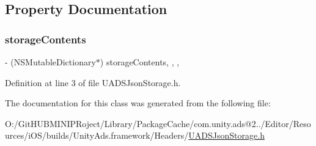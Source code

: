 \subsection{Property Documentation}
\mbox{\label{interface_u_a_d_s_json_storage_a579b58469c5d3f2a2d83f36f38396d8e}} 
\subsubsection{\texorpdfstring{storageContents}{storageContents}}
{\footnotesize\ttfamily -\/ (N\+S\+Mutable\+Dictionary$\ast$) storage\+Contents\hspace{0.3cm}{\ttfamily [read]}, {\ttfamily [write]}, {\ttfamily [nonatomic]}, {\ttfamily [strong]}}



Definition at line 3 of file U\+A\+D\+S\+Json\+Storage.\+h.



The documentation for this class was generated from the following file\+:\begin{DoxyCompactItemize}
\item 
O\+:/\+Git\+H\+U\+B\+M\+I\+N\+I\+P\+Roject/\+Library/\+Package\+Cache/com.\+unity.\+ads@2../\+Editor/\+Resources/i\+O\+S/builds/\+Unity\+Ads.\+framework/\+Headers/\mbox{\hyperlink{_u_a_d_s_json_storage_8h}{U\+A\+D\+S\+Json\+Storage.\+h}}\end{DoxyCompactItemize}
